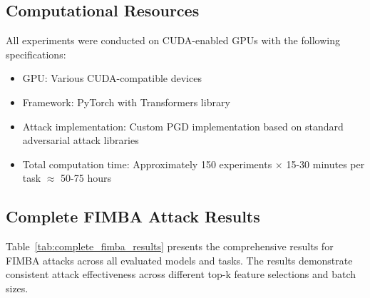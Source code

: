 \documentclass{article} %
\begin{document}
\subsection{Computational Resources}

All experiments were conducted on CUDA-enabled GPUs with the following specifications:
\begin{itemize}
    \item GPU: Various CUDA-compatible devices
    \item Framework: PyTorch with Transformers library
    \item Attack implementation: Custom PGD implementation based on standard adversarial attack libraries
    \item Total computation time: Approximately 150 experiments $\times$ 15-30 minutes per task $\approx$ 50-75 hours
\end{itemize}

\subsection{Complete FIMBA Attack Results}

Table~\ref{tab:complete_fimba_results} presents the comprehensive results for FIMBA attacks across all evaluated models and tasks. The results demonstrate consistent attack effectiveness across different top-k feature selections and batch sizes.
\end{document}
